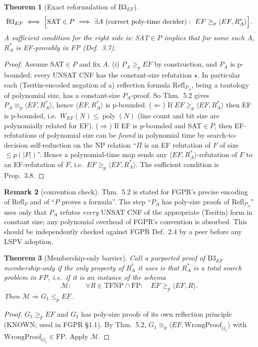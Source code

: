 \documentclass[11pt]{article}
\newtheorem{theorem}{Theorem}
\theoremstyle{definition}
\newtheorem{remark}[theorem]{Remark}
\begin{document}
\begin{theorem}[Exact reformulation of $\mathrm{B3}_{EF}$]\label{thm:reform}
\[
\mathrm{B3}_{EF}\iff\Bigl[\mathrm{SAT}\in P\ \Longrightarrow\ \exists A\ \text{(correct poly-time decider)}:\ EF\ge_p\langle EF,R^\ast_A\rangle\Bigr].
\]
A sufficient condition for the right side is: SAT$\in P$ implies that for some such $A$, $R^\ast_A$ is EF-provably in FP (Def.~3.7).
\end{theorem}
\begin{proof}
Assume SAT$\in P$ and fix $A$. (i) $P_A\ge_p EF$ by construction, and $P_A$ is p-bounded: every UNSAT CNF has the constant-size refutation $\star$. In particular each (Tseitin-encoded negation of a) reflection formula $\mathrm{Refl}_{P_A}$, being a tautology of polynomial size, has a constant-size $P_A$-proof. So Thm.~5.2 gives $P_A\equiv_p\langle EF,R^\ast_A\rangle$, hence $\langle EF,R^\ast_A\rangle$ is p-bounded.
($\Leftarrow$) If $EF\ge_p\langle EF,R^\ast_A\rangle$ then EF is p-bounded, i.e.\ $\overline W_{EF}(N)\le\operatorname{poly}(N)$ (line count and bit size are polynomially related for EF).
($\Rightarrow$) If EF is p-bounded and SAT$\in P$, then EF-refutations of polynomial size can be \emph{found} in polynomial time by search-to-decision self-reduction on the NP relation ``$\Pi$ is an EF refutation of $F$ of size $\le p(|F|)$''. Hence a polynomial-time map sends any $\langle EF,R^\ast_A\rangle$-refutation of $F$ to an EF-refutation of $F$, i.e.\ $EF\ge_p\langle EF,R^\ast_A\rangle$. The sufficient condition is Prop.~3.8.
\end{proof}

\begin{remark}[convention check]\label{rem:conv}
Thm.~5.2 is stated for FGPR's precise encoding of $\mathrm{Refl}_P$ and of ``$P$ proves a formula''. The step ``$P_A$ has poly-size proofs of $\mathrm{Refl}_{P_A}$'' uses only that $P_A$ refutes \emph{every} UNSAT CNF of the appropriate (Tseitin) form in constant size; any polynomial overhead of FGPR's convention is absorbed. This should be independently checked against FGPR Def.~2.4 by a peer before any LSPV adoption.
\end{remark}

\begin{theorem}[Membership-only barrier]\label{thm:barrier}
Call a purported proof of $\mathrm{B3}_{EF}$ \emph{membership-only} if the only property of $R^\ast_A$ it uses is that $R^\ast_A$ is a total search problem in FP, i.e.\ if it is an instance of the schema
\[
\mathcal M:\qquad \forall R\in\mathrm{TFNP}\cap\mathrm{FP}:\quad EF\ge_p\langle EF,R\rangle .
\]
Then $\mathcal M\Rightarrow G_1\le_p EF$.
\end{theorem}
\begin{proof}
$G_1\ge_p EF$ and $G_1$ has poly-size proofs of its own reflection principle (KNOWN; used in FGPR \S1.1). By Thm.~5.2, $G_1\equiv_p\langle EF,\mathrm{WrongProof}_{G_1}\rangle$ with $\mathrm{WrongProof}_{G_1}\in\mathrm{FP}$. Apply $\mathcal M$.
\end{proof}
\end{document}
